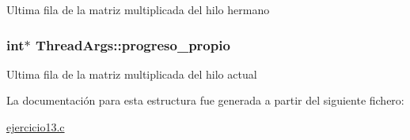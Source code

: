 Ultima fila de la matriz multiplicada del hilo hermano \hypertarget{structThreadArgs_a2a69690c663d2d50d808de734f46a67d}{
\subsubsection[{progreso\-\_\-propio}]{\setlength{\rightskip}{0pt plus 5cm}int$\ast$ Thread\-Args\-::progreso\-\_\-propio}}\label{structThreadArgs_a2a69690c663d2d50d808de734f46a67d}
Ultima fila de la matriz multiplicada del hilo actual 

La documentación para esta estructura fue generada a partir del siguiente fichero\-:\begin{DoxyCompactItemize}
\item 
\hyperlink{ejercicio13_8c}{ejercicio13.\-c}\end{DoxyCompactItemize}
